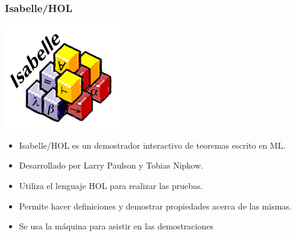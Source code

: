 \begin{frame}
\frametitle{Isabelle/HOL}

\includegraphics[scale=0.5]{images/isabelle.png}

\begin{itemize}
\item{Isabelle/HOL es un demostrador interactivo de teoremas escrito en ML.}
\pause
\item{Desarrollado por Larry Paulson y Tobias Nipkow.}
\pause
\item{Utiliza el lenguaje HOL para realizar las pruebas.}
\pause
\item{Permite hacer definiciones y demostrar propiedades acerca de las mismas.}
\pause
\item{Se usa la máquina para asistir en las demostraciones}
\pause
\end{itemize}

\end{frame}

